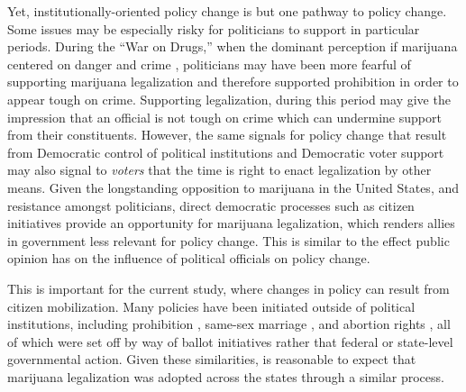 Yet, institutionally-oriented policy change is but one pathway to policy change. Some issues may be especially risky for politicians to support in particular periods. During the ``War on Drugs,'' when the dominant perception if marijuana centered on danger and crime \citep{caulkins_et_al_2012,rosenthal_and_kubby_1996,alexander_2010}, politicians may have been more fearful of supporting marijuana legalization and therefore supported prohibition in order to appear tough on crime. Supporting legalization, during this period may give the impression that an official is not tough on crime which can undermine support from their constituents. However, the same signals for policy change that result from Democratic control of political institutions and Democratic voter support may also signal to \textit{voters} that the time is right to enact legalization by other means. Given the longstanding opposition to marijuana in the United States, and resistance amongst politicians, direct democratic processes such as citizen initiatives provide an opportunity for marijuana legalization, which renders allies in government less relevant for policy change. This is similar to the effect public opinion has on the influence of political officials on policy change. 


This is important for the current study, where changes in policy can result from citizen mobilization. Many policies have been initiated outside of political institutions, including prohibition \citep{andrews_and_seguin_2015,gusfield_1963}, same-sex marriage \citep{soule_2004}, and abortion rights \citep{mcveigh_and_diaz_2009}, all of which were set off by way of ballot initiatives rather that federal or state-level governmental action. Given these similarities, is reasonable to expect that marijuana legalization was adopted across the states through a similar process.










